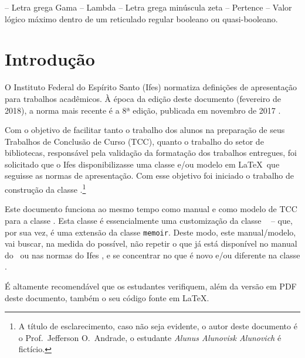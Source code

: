 \documentclass[times,english,brazil,oneside,section=TITLE]{ifes8}
\begin{document}
\begin{simbolos}
  \simb{$\Gamma$} -- Letra grega Gama
  \simb{$\Lambda$} -- Lambda
  \simb{$\zeta$} -- Letra grega minúscula zeta
  \simb{$\in$} -- Pertence
  \simb{$\top$} -- Valor lógico máximo dentro de um reticulado regular booleano ou quasi-booleano.
\end{simbolos}
\cleardoublepage


\imprimirsumario
\cleardoublepage


\textual


\setlength{\afterchapskip}{0\baselineskip}


\chapter{Introdução}
\label{cha:introducao}

O Instituto Federal do Espírito Santo (Ifes) normatiza definições de
apresentação para trabalhos acadêmicos. À época da edição deste
documento (fevereiro de 2018), a norma mais recente é a 8ª edição,
publicada em novembro de 2017 \cite{Ifes2017}.

Com o objetivo de facilitar tanto o trabalho dos alunos na preparação
de seus Trabalhos de Conclusão de Curso (TCC), quanto o trabalho do
setor de bibliotecas, responsável pela validação da formatação dos
trabalhos entregues, foi solicitado que o Ifes disponibilizasse uma
classe e/ou modelo em \LaTeX\ que seguisse as normas de
apresentação. Com esse objetivo foi iniciado o trabalho de construção
da classe \ifestex.\footnote{A título de esclarecimento, caso não seja
  evidente, o autor deste documento é o Prof.\ Jefferson O.\ Andrade,
  o estudante \emph{Alunus Alunovisk Alunovich} é fictício.}

Este documento funciona ao mesmo tempo como manual e como modelo de
TCC para a classe \ifestex. Esta classe é essencialmente uma
customização da classe \abnTeX\ \cite{abntex2classe} -- que, por sua
vez, é uma extensão da classe \texttt{memoir}. Deste modo, este
manual/modelo, vai buscar, na medida do possível, não repetir o que já
está disponível no manual do \abnTeX\ ou nas normas do Ifes
\cite{Ifes2017}, e se concentrar no que é novo e/ou diferente na
classe \ifestex.

É altamente recomendável que os estudantes verifiquem, além da versão
em PDF deste documento, também o seu código fonte em \LaTeX.
\end{document}
